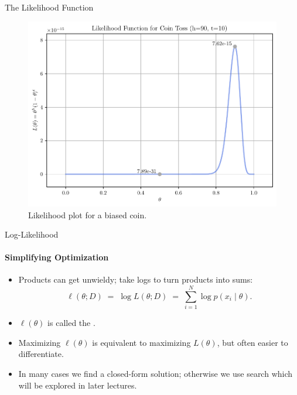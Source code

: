 \begin{frame}{The Likelihood Function}
  \begin{figure}
    \centering
    \includegraphics[height=0.65\textheight]{images/coin_toss_likelihood.pdf}
    \caption{Likelihood plot for a biased coin.}
  \end{figure}
\end{frame}

\begin{frame}{Log-Likelihood}
  \framesubtitle{Simplifying Optimization}
  \begin{itemize}
    \item Products can get unwieldy; take logs to turn products into sums:
          \[
            \ell(\theta;D) \;=\;\log L(\theta;D)
            \;=\;\sum_{i=1}^N \log p(x_i \mid \theta).
          \]
    \item $\ell(\theta)$ is called the .
    \item Maximizing $\ell(\theta)$ is equivalent to maximizing $L(\theta)$, but often easier to differentiate.
    \item In many cases we find a closed-form solution; otherwise we use  search which will be explored in later lectures.
  \end{itemize}
\end{frame}


